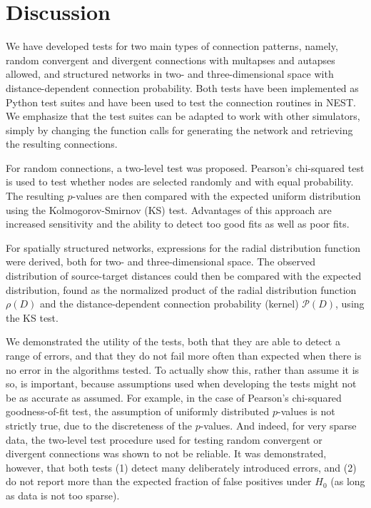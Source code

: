 \chapter{Discussion\label{ch:disc}}


We have developed tests for two main types of connection patterns, namely, random convergent and divergent connections with multapses and autapses allowed, and structured networks in two- and three-dimensional space with distance-dependent connection probability. Both tests have been implemented as Python test suites and have been used to test the connection routines in NEST. We emphasize that the test suites can be adapted to work with other simulators, simply by changing the function calls for generating the network and retrieving the resulting connections.

For random connections, a two-level test was proposed. Pearson's chi-squared test is used to test whether nodes are selected randomly and with equal probability. The resulting $p$-values are then compared with the expected uniform distribution using the Kolmogorov-Smirnov (KS) test. Advantages of this approach are increased sensitivity and the ability to detect too good fits as well as poor fits.

For spatially structured networks, expressions for the radial distribution function were derived, both for two- and three-dimensional space. The observed distribution of source-target distances could then be compared with the expected distribution, found as the normalized product of the radial distribution function $\rho(D)$ and the distance-dependent connection probability (kernel) $\mathcal{P}(D)$, using the KS test. 


We demonstrated the utility of the tests, both that they are able to detect a range of errors, and that they do not fail more often than expected when there is no error in the algorithms tested. To actually show this, rather than assume it is so, is important, because assumptions used when developing the tests might not be as accurate as assumed. For example, in the case of Pearson's chi-squared goodness-of-fit test, the assumption of uniformly distributed $p$-values is not strictly true, due to the discreteness of the $p$-values. And indeed, for very sparse data, the two-level test procedure used for testing random convergent or divergent connections was shown to not be reliable. It was demonstrated, however, that both tests (1) detect many deliberately introduced errors, and (2) do not report more than the expected fraction of false positives under $H_0$ (as long as data is not too sparse). 

